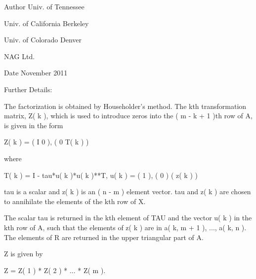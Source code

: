 \begin{DoxyAuthor}{Author}
Univ. of Tennessee 

Univ. of California Berkeley 

Univ. of Colorado Denver 

N\+A\+G Ltd. 
\end{DoxyAuthor}
\begin{DoxyDate}{Date}
November 2011 
\end{DoxyDate}
\begin{DoxyParagraph}{Further Details\+: }
\begin{DoxyVerb}  The factorization is obtained by Householder's method.  The kth
  transformation matrix, Z( k ), which is used to introduce zeros into
  the ( m - k + 1 )th row of A, is given in the form

     Z( k ) = ( I     0   ),
              ( 0  T( k ) )

  where

     T( k ) = I - tau*u( k )*u( k )**T,   u( k ) = (   1    ),
                                                   (   0    )
                                                   ( z( k ) )

  tau is a scalar and z( k ) is an ( n - m ) element vector.
  tau and z( k ) are chosen to annihilate the elements of the kth row
  of X.

  The scalar tau is returned in the kth element of TAU and the vector
  u( k ) in the kth row of A, such that the elements of z( k ) are
  in  a( k, m + 1 ), ..., a( k, n ). The elements of R are returned in
  the upper triangular part of A.

  Z is given by

     Z =  Z( 1 ) * Z( 2 ) * ... * Z( m ).\end{DoxyVerb}
 
\end{DoxyParagraph}
